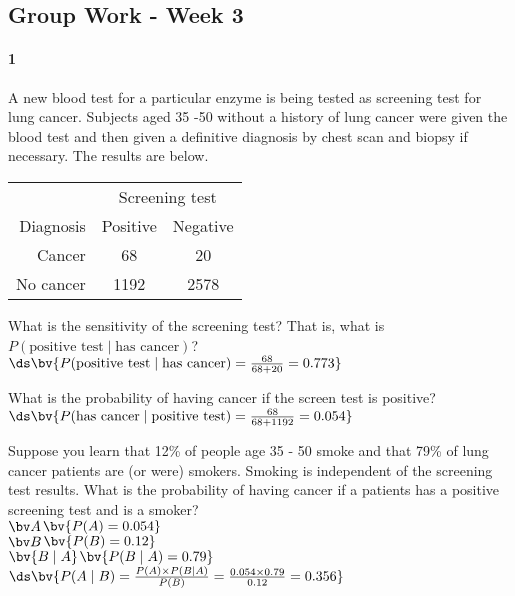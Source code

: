 \documentclass{article}
\begin{document}
\begin{flushleft}
\section*{Group Work - Week 3}

\paragraph{1} A new blood test for a particular enzyme is being tested as screening test for lung cancer. Subjects aged 35 -50 without a history of lung cancer were given the blood test and then given a definitive diagnosis by chest scan and biopsy if necessary. The results are below.\\ \medskip
{\centering
\begin{tabular}{ r| c c}
& \multicolumn{2}{c}{Screening test}\\
Diagnosis & Positive & Negative\\
\hline
 Cancer &  68  &  20  \\
 No cancer  & 1192   &  2578 \\
\end{tabular}
\par}


\begin{enumalpha}
\item What is the sensitivity of the screening test? That is, what is $P(\text{positive test} \mid \text{has cancer})$?\\
\medskip
$\ds \bv{P(\text{positive test} \mid \text{has cancer}) = \frac{68}{68+20} = 0.773}$
\vspace{.75in}

\item What is the probability of having cancer if the screen test is positive?\\
\medskip
$\ds \bv{P(\text{has cancer} \mid \text{positive test}) = \frac{68}{68+1192} = 0.054}$
\vspace{.75in}

\item Suppose you learn that 12\% of people age 35 - 50 smoke and that 79\% of lung cancer patients are (or were) smokers. Smoking is independent of the screening test results. What is the probability of having cancer if a patients has a positive screening test and is a smoker?\\
\medskip
$\bv A$$\bv{P(A) = 0.054}$\\
$\bv B$$\bv{P(B) = 0.12}$\\
$\bv{B \mid A}$$\bv{P(B \mid A) = 0.79}$\\ \medskip
$\ds \bv{P(A \mid B) = \frac{P(A) \times P(B \mid A)}{P(B)} = \frac{0.054 \times 0.79}{0.12} = 0.356}$
\end{enumalpha}


\end{flushleft}
\end{document}

